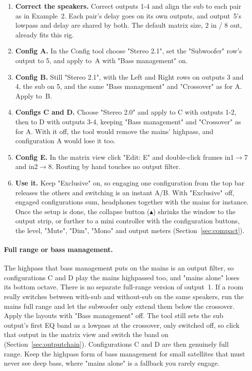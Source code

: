 \begin{enumerate}[nosep]
  \item \textbf{Correct the speakers.} Correct outputs 1-4 and align the sub to each pair as in Example~2. Each pair's delay goes on its own outputs, and output~5's lowpass and delay are shared by both. The default matrix size, 2 in / 8 out, already fits this rig.
  \item \textbf{Config A.} In the Config tool choose "Stereo 2.1", set the "Subwoofer" row's output to 5, and apply to~A with "Bass management" on.
  \item \textbf{Config B.} Still "Stereo 2.1", with the Left and Right rows on outputs 3 and 4, the sub on 5, and the same "Bass management" and "Crossover" as for A. Apply to~B.
  \item \textbf{Configs C and D.} Choose "Stereo 2.0" and apply to C with outputs 1-2, then to D with outputs 3-4, keeping "Bass management" and "Crossover" as for A. With it off, the tool would remove the mains' highpass, and configuration A would lose it too.
  \item \textbf{Config E.} In the matrix view click "Edit: E" and double-click frames in1$\rightarrow$7 and in2$\rightarrow$8. Routing by hand touches no output filter.
  \item \textbf{Use it.} Keep "Exclusive" on, so engaging one configuration from the top bar releases the others and switching is an instant A/B. With "Exclusive" off, engaged configurations sum, headphones together with the mains for instance. Once the setup is done, the collapse button (\textbf{$\blacktriangle$}) shrinks the window to the output strip, or further to a mini controller with the configuration buttons, the level, "Mute", "Dim", "Mono" and output meters (Section~\ref{sec:compact}).
\end{enumerate}

\paragraph{Full range or bass management.} The highpass that bass management puts on the mains is an output filter, so configurations C and D play the mains highpassed too, and "mains alone" loses its bottom octave. There is no separate full-range version of output~1. If a room really switches between with-sub and without-sub on the same speakers, run the mains full range and let the subwoofer only extend them below the crossover. Apply the layouts with "Bass management" off. The tool still sets the sub output's first EQ band as a lowpass at the crossover, only switched off, so click that output in the matrix view and switch the band on (Section~\ref{sec:outputchain}). Configurations C and D are then genuinely full range. Keep the highpass form of bass management for small satellites that must never see deep bass, where "mains alone" is a fallback you rarely engage.

